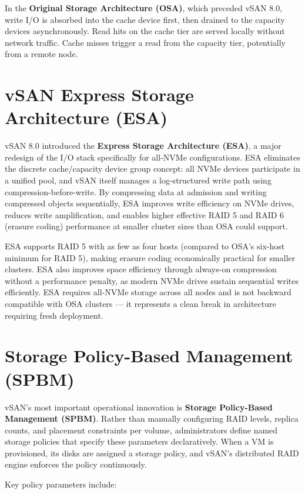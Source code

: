 In the \textbf{Original Storage Architecture (OSA)}, which preceded vSAN 8.0, write I/O is absorbed into the cache device first, then drained to the capacity devices asynchronously. Read hits on the cache tier are served locally without network traffic. Cache misses trigger a read from the capacity tier, potentially from a remote node.

\section{vSAN Express Storage Architecture (ESA)}
vSAN 8.0 introduced the \textbf{Express Storage Architecture (ESA)}, a major redesign of the I/O stack specifically for all-NVMe configurations. ESA eliminates the discrete cache/capacity device group concept: all NVMe devices participate in a unified pool, and vSAN itself manages a log-structured write path using compression-before-write. By compressing data at admission and writing compressed objects sequentially, ESA improves write efficiency on NVMe drives, reduces write amplification, and enables higher effective RAID 5 and RAID 6 (erasure coding) performance at smaller cluster sizes than OSA could support.

ESA supports RAID 5 with as few as four hosts (compared to OSA's six-host minimum for RAID 5), making erasure coding economically practical for smaller clusters. ESA also improves space efficiency through always-on compression without a performance penalty, as modern NVMe drives sustain sequential writes efficiently. ESA requires all-NVMe storage across all nodes and is not backward compatible with OSA clusters --- it represents a clean break in architecture requiring fresh deployment.

\section{Storage Policy-Based Management (SPBM)}
vSAN's most important operational innovation is \textbf{Storage Policy-Based Management (SPBM)}. Rather than manually configuring RAID levels, replica counts, and placement constraints per volume, administrators define named storage policies that specify these parameters declaratively. When a VM is provisioned, its disks are assigned a storage policy, and vSAN's distributed RAID engine enforces the policy continuously.

Key policy parameters include:

